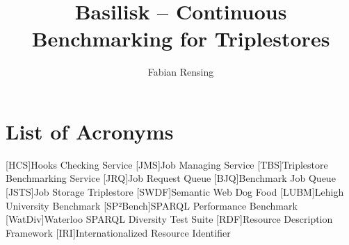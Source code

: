 \documentclass[]{upb_cs_thesis} %
\title{Basilisk -- Continuous Benchmarking for Triplestores}
\author{Fabian Rensing}
\begin{document}
\cleardoublepage
\vspace*{\fill}
\begin{abstract}
	
\end{abstract}
\acresetall
\vspace*{\fill}
\emptypage

\tableofcontents %





\newpage
\pagestyle{plain}



\newpage
{}
\section*{List of Acronyms}
\begin{acronym}[WWWWW]
	[HCS]{Hooks Checking Service}
	[JMS]{Job Managing Service}
	[TBS]{Triplestore Benchmarking Service}
	[JRQ]{Job Request Queue}
	[BJQ]{Benchmark Job Queue}
	[JSTS]{Job Storage Triplestore}
	[SWDF]{Semantic Web Dog Food}
	[LUBM]{Lehigh University Benchmark}
	[SP²Bench]{SPARQL Performance Benchmark}
	[WatDiv]{Waterloo SPARQL Diversity Test Suite}
	[RDF]{Resource Description Framework}
	[IRI]{Internationalized Resource Identifier}
\end{acronym}


\newpage
\appendix

\end{document}
